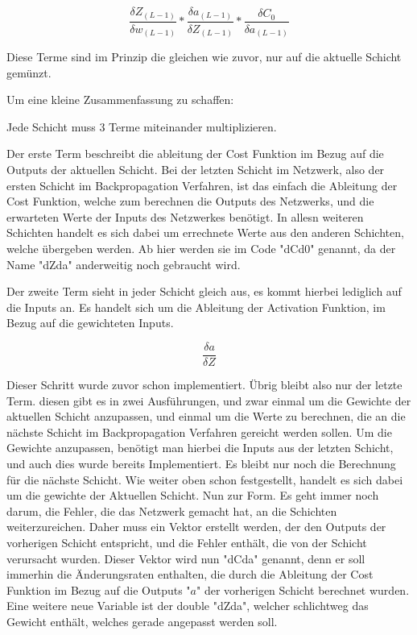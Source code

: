 \documentclass[12pt]{article}
\begin{document}
$$
\frac{\delta Z_{(L-1)}}{\delta w_{(L-1)}}*
\frac{\delta a_{(L-1)}}{\delta Z_{(L-1)}}*
\frac{\delta C_0}{\delta a_{(L-1)}}
$$

Diese Terme sind im Prinzip die gleichen wie zuvor, nur auf die aktuelle Schicht gemünzt. 

Um eine kleine Zusammenfassung zu schaffen:

Jede Schicht muss 3 Terme miteinander multiplizieren. 

Der erste Term beschreibt die ableitung der Cost Funktion im Bezug auf die Outputs der aktuellen Schicht. Bei der letzten Schicht im Netzwerk, also der ersten Schicht im Backpropagation Verfahren, ist das einfach die Ableitung der Cost Funktion, welche zum berechnen die Outputs des Netzwerks, und die erwarteten Werte der Inputs des Netzwerkes benötigt. In allesn weiteren Schichten handelt es sich dabei um errechnete Werte aus den anderen Schichten, welche übergeben werden. Ab hier werden sie im Code "dCd0" genannt, da der Name "dZda" anderweitig noch gebraucht wird.

Der zweite Term sieht in jeder Schicht gleich aus, es kommt hierbei lediglich auf die Inputs an. Es handelt sich um die Ableitung der Activation Funktion, im Bezug auf die gewichteten Inputs.

$$\frac{\delta a}{\delta Z}$$

Dieser Schritt wurde zuvor schon implementiert.
Übrig bleibt also nur der letzte Term. diesen gibt es in zwei Ausführungen, und zwar einmal um die Gewichte der aktuellen Schicht anzupassen, und einmal um die Werte zu berechnen, die an die nächste Schicht im Backpropagation Verfahren gereicht werden sollen.
Um die Gewichte anzupassen, benötigt man hierbei die Inputs aus der letzten Schicht, und auch dies wurde bereits Implementiert. Es bleibt nur noch die Berechnung für die nächste Schicht. Wie weiter oben schon festgestellt, handelt es sich dabei um die gewichte der Aktuellen Schicht. 
Nun zur Form. Es geht immer noch darum, die Fehler, die das Netzwerk gemacht hat, an die Schichten weiterzureichen. Daher muss ein Vektor erstellt werden, der den Outputs der vorherigen Schicht entspricht, und die Fehler enthält, die von der Schicht verursacht wurden.
Dieser Vektor wird nun "dCda" genannt, denn er soll immerhin die Änderungsraten enthalten, die durch die Ableitung der Cost Funktion im Bezug auf die Outputs "$a$" der vorherigen Schicht berechnet wurden. Eine weitere neue Variable ist der double "dZda", welcher schlichtweg das Gewicht enthält, welches gerade angepasst werden soll.
\end{document}
